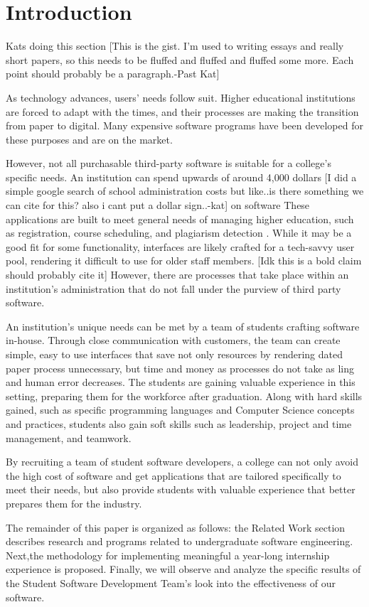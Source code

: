 \section{Introduction}
Kats doing this section
[This is the gist. I'm used to writing essays and really short papers, so this needs to be fluffed and fluffed and fluffed some more. Each point should probably be a paragraph.-Past Kat]

As technology advances, users' needs follow suit. Higher educational institutions are forced to adapt with the times, and their processes are making the transition from paper to digital. Many expensive software programs have been developed for these purposes and are on the market. 

However, not all purchasable third-party software is suitable for a college's specific needs. An institution can spend upwards of around 4,000 dollars [I did a simple google search of school administration costs but like..is there something we can cite for this? also i cant put a dollar sign..-kat] on software These applications are built to meet general needs of managing higher education, such as registration, course scheduling, and plagiarism detection \cite{plagarismsoftware}. While it may be a good fit for some functionality, interfaces are likely crafted for a tech-savvy user pool, rendering it difficult to use for older staff members. [Idk this is a bold claim should probably cite it] However, there are processes that take place within an institution's administration that do not fall under the purview of third party software.

An institution's unique needs can be met by a team of students crafting software in-house. Through close communication with customers, the team can create simple, easy to use interfaces that save not only resources by rendering dated paper process unnecessary, but time and money as processes do not take as ling and human error decreases. The students are gaining valuable experience in this setting, preparing them for the workforce after graduation. Along with hard skills gained, such as specific programming languages and Computer Science concepts and practices, students also gain soft skills \cite{softskills} such as leadership, project and time management, and teamwork.

By recruiting a team of student software developers, a college can not only avoid the high cost of software and get applications that are tailored specifically to meet their needs, but also provide students with valuable experience that better prepares them for the industry. 

The remainder of this paper is organized as follows: the Related Work section describes research and programs related to undergraduate software engineering. Next,the methodology for implementing meaningful a year-long internship experience is proposed. Finally, we will observe and analyze the specific results of the Student Software Development Team's look into the effectiveness of our software.

